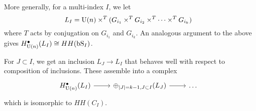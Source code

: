 More generally, for a multi-index $I$, we let
\[
	L_I = \mathrm{U}(n) \times^T (G_{i_1} \times^T G_{i_2} \times^T \dots \times^T G_{i_k})
\]
where $T$ acts by conjugation on $G_{i_1}$ and $G_{i_k}$.
An analogous argument to the above gives $H^\bullet_{\mathrm{U}(n)}(L_I) \cong HH(\mathrm{bS}_I)$.

For $J \subset I$, we get an inclusion $L_J \to L_I$ that behaves well with respect to composition of inclusions.
These assemble into a complex
\[
	\begin{tikzcd}
		H^\bullet_{\U(n)}(L_I) \rar & \oplus_{\abs{J} = k-1, J \subset I}(L_J) \rar & \dots 
	\end{tikzcd}
\]
which is isomorphic to $HH(C_I)$.
